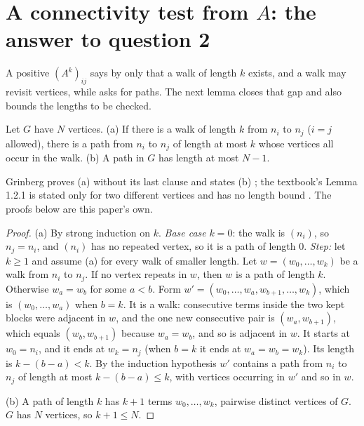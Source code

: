 \section{A connectivity test from $A$: the answer to question 2}\label{sec:connectivity}

A positive $(A^k)_{ij}$ says by  only that a walk of length $k$ exists, and a walk may revisit vertices, while  asks for paths. The next lemma closes that gap and also bounds the lengths to be checked.

\begin{lemma}\label{lem:walkpath}
Let $G$ have $N$ vertices.
(a) If there is a walk of length $k$ from $n_i$ to $n_j$ ($i = j$ allowed), there is a path from $n_i$ to $n_j$ of length at most $k$ whose vertices all occur in the walk.
(b) A path in $G$ has length at most $N - 1$.
\end{lemma}

Grinberg proves (a) without its last clause and states (b) \cite[Corollary 2.9.7, p.~39; p.~40]{grinberg_graph_theory}; the textbook's Lemma 1.2.1 is stated only for two different vertices and has no length bound \cite[p.~23]{petrosyan_graph_theory}. The proofs below are this paper's own.

\begin{proof}
(a) By strong induction on $k$. \emph{Base case} $k = 0$: the walk is $(n_i)$, so $n_j = n_i$, and $(n_i)$ has no repeated vertex, so it is a path of length $0$. \emph{Step:} let $k \ge 1$ and assume (a) for every walk of smaller length. Let $w = (w_0, \dots, w_k)$ be a walk from $n_i$ to $n_j$. If no vertex repeats in $w$, then $w$ is a path of length $k$. Otherwise $w_a = w_b$ for some $a < b$. Form $w' = (w_0, \dots, w_a, w_{b+1}, \dots, w_k)$, which is $(w_0, \dots, w_a)$ when $b = k$. It is a walk: consecutive terms inside the two kept blocks were adjacent in $w$, and the one new consecutive pair is $(w_a, w_{b+1})$, which equals $(w_b, w_{b+1})$ because $w_a = w_b$, and so is adjacent in $w$. It starts at $w_0 = n_i$, and it ends at $w_k = n_j$ (when $b = k$ it ends at $w_a = w_b = w_k$). Its length is $k - (b - a) < k$. By the induction hypothesis $w'$ contains a path from $n_i$ to $n_j$ of length at most $k - (b-a) \le k$, with vertices occurring in $w'$ and so in $w$.

(b) A path of length $k$ has $k + 1$ terms $w_0, \dots, w_k$, pairwise distinct vertices of $G$. $G$ has $N$ vertices, so $k + 1 \le N$.
\end{proof}

